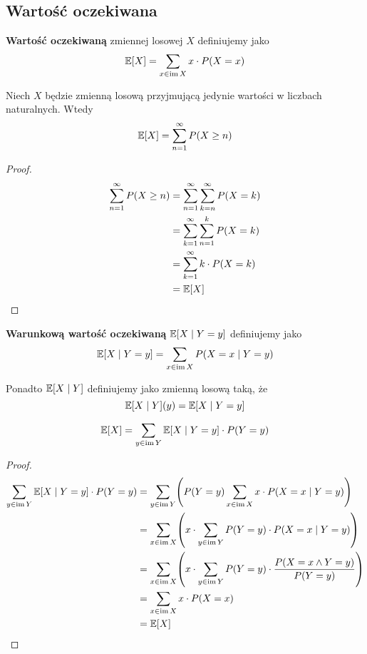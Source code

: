 \subsection{Wartość oczekiwana}
\begin{definition}
    \textbf{Wartość oczekiwaną} zmiennej losowej \( X \) definiujemy jako
    \[
        \expected{X} = \sum_{x \in \im X} x \cdot P(X = x)
    \]
\end{definition}
\begin{theorem}[Lemat 2.9 P\&C]
    \label{expected-value-of-natural-random-variable}
    Niech \( X \) będzie zmienną losową przyjmującą jedynie wartości w liczbach naturalnych. Wtedy
    \[
        \expected{X} = \sum_{n=1}^\infty P(X \geq n)
    \]
\end{theorem}
\begin{proof}
    \begin{align*}
        \sum_{n=1}^\infty P(X \geq n)
            &= \sum_{n=1}^\infty \sum_{k=n}^\infty P(X = k) \\
            &= \sum_{k=1}^\infty \sum_{n=1}^k P(X = k) \\
            &= \sum_{k=1}^\infty k \cdot P(X = k) \\
            &= \expected{X}
    \end{align*}
\end{proof}

\begin{definition}
    \textbf{Warunkową wartość oczekiwaną} \( \expected{X \mid Y = y} \) definiujemy jako
    \[
        \expected{X \mid Y = y} = \sum_{x \in \im X} P\pars{X = x \mid Y = y}
    \]
    
    Ponadto \( \expected{X \mid Y} \) definiujemy jako zmienną losową taką, że 
    \[ 
        \expected{X \mid Y}(y) = \expected{X \mid Y = y} 
    \]
\end{definition}

\begin{lemma}
    \[
        \expected{X} = \sum_{y \in \im Y} \expected{X \mid Y = y} \cdot P(Y = y)
    \]
\end{lemma}
\begin{proof}
    \begin{align*}
        \sum_{y \in \im Y} \expected{X \mid Y = y} \cdot P(Y = y)
            &= \sum_{y \in \im Y} \pars{P(Y = y) \sum_{x \in \im X} x \cdot P(X = x \mid Y = y)} \\
            &= \sum_{x \in \im X} \pars{x \cdot \sum_{y \in \im Y}P(Y = y)  \cdot P(X = x \mid Y = y)} \\
            &= \sum_{x \in \im X} \pars{x \cdot \sum_{y \in \im Y}P(Y = y)  \cdot
            \frac{P(X = x \land Y = y)}{P(Y = y)}} \\
            &= \sum_{x \in \im X} x \cdot P(X = x) \\
            &= \expected{X}
    \end{align*}
\end{proof}

